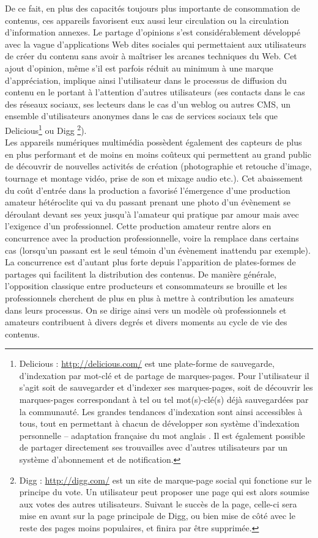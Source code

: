 De ce fait, en plus des capacités toujours plus importante de consommation de contenus, ces appareils favorisent eux aussi leur circulation ou la circulation d’information annexes. 
Le partage d’opinions s’est considérablement développé avec la vague d'applications Web dites sociales qui permettaient aux utilisateurs de créer du contenu sans avoir à maîtriser les arcanes techniques du Web. 
Cet ajout d’opinion, même s’il est parfois réduit au minimum à une marque d'appréciation, implique ainsi l’utilisateur dans le processus de diffusion du contenu en le portant à l'attention d'autres utilisateurs (ses contacts dans le cas des réseaux sociaux, ses lecteurs dans le cas d'un weblog ou autres CMS, un ensemble d'utilisateurs anonymes dans le cas de services sociaux tels que Delicious\footnote{Delicious : \url{http://delicious.com/} est une plate-forme de sauvegarde, d'indexation par mot-clé et de partage de marques-pages. Pour l'utilisateur il s'agit soit de sauvegarder et d'indexer ses marques-pages, soit de découvrir les marques-pages correspondant à tel ou tel mot(s)-clé(s) déjà sauvegardées par la communauté. Les grandes tendances d'indexation sont ainsi accessibles à tous, tout en permettant à chacun de développer son système d'indexation personnelle -- adaptation française du mot anglais . Il est également possible de partager directement ses trouvailles avec d'autres utilisateurs par un système d'abonnement et de notification.} ou Digg \footnote{Digg : \url{http://digg.com/} est un site de marque-page social qui fonctione sur le principe du vote. Un utilisateur peut proposer une page qui est alors soumise aux votes des autres utilisateurs. Suivant le succès de la page, celle-ci sera mise en avant sur la page principale de Digg, ou bien mise de côté avec le reste des pages moins populaires, et finira par être supprimée.}).\\


Les appareils numériques multimédia possèdent également des capteurs de plus en plus performant et de moins en moins coûteux qui permettent au grand public de découvrir de nouvelles activités de création (photographie et retouche d’image, tournage et montage vidéo, prise de son et mixage audio etc.).
Cet abaissement du coût d’entrée dans la production a favorisé l'émergence d’une production amateur hétéroclite qui va du passant prenant une photo d’un évènement se déroulant devant ses yeux jusqu’à l’amateur qui pratique par amour mais avec l'exigence d’un professionnel. 
Cette production amateur rentre alors en concurrence avec la production professionnelle, voire la remplace dans certains cas (lorsqu’un passant est le seul témoin d’un évènement inattendu par exemple). 
La concurrence est d'autant plus forte depuis l’apparition de plates-formes de partages qui facilitent la distribution des contenus. 
De manière générale, l’opposition classique entre producteurs et consommateurs se brouille et les professionnels cherchent de plus en plus à mettre à contribution les amateurs dans leurs processus. 
On se dirige ainsi vers un modèle où professionnels et amateurs contribuent à divers degrés et divers moments au cycle de vie des contenus.\\


